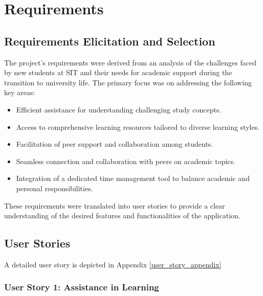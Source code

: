 
\chapter{Requirements}\label{requirements}

\section{Requirements Elicitation and Selection}

The project's requirements were derived from an analysis of the challenges faced by new students at SIT and their needs for academic support during the transition to university life. The primary focus was on addressing the following key areas:

\begin{itemize}
  \item Efficient assistance for understanding challenging study concepts.
  \item Access to comprehensive learning resources tailored to diverse learning styles.
  \item Facilitation of peer support and collaboration among students.
  \item Seamless connection and collaboration with peers on academic topics.
  \item Integration of a dedicated time management tool to balance academic and personal responsibilities.
\end{itemize}

These requirements were translated into user stories to provide a clear understanding of the desired features and functionalities of the application.

\section{User Stories}

A detailed user story is depicted in Appendix \ref{user_story_appendix}

\subsection{User Story 1: Assistance in Learning}

